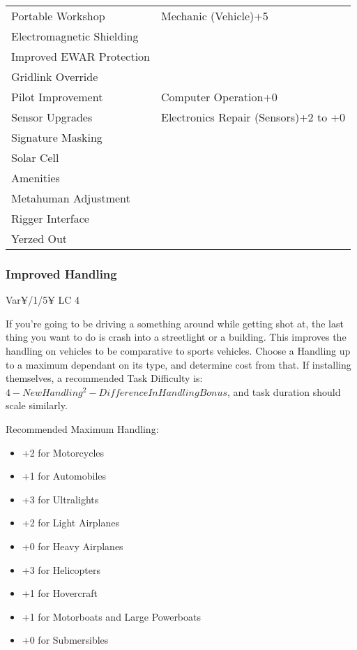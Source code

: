 \begin{multicols*}{2}
\begin{center}
\begin{adjustwidth}{-9mm}{}
{\begin{tabular}{|p{5cm}|p{6.25cm}|}
					Portable Workshop & Mechanic (Vehicle)+5 \\
					Electromagnetic Shielding & \\
					Improved EWAR Protection & \\
					Gridlink Override & \\
					Pilot Improvement & Computer Operation+0 \\
					Sensor Upgrades & Electronics Repair (Sensors)+2 to +0 \\
					Signature Masking & \\
					Solar Cell & \\
					Amenities & \\
					Metahuman Adjustment & \\
					Rigger Interface & \\
					Yerzed Out & \\
					\hline
				\end{tabular}
			}
		\end{adjustwidth}
	\end{center}
	
	

	\subsubsection{Improved Handling}
	Var¥/1/5¥ LC 4
	
	If you're going to be driving a something around while getting shot at, the last thing you want to do is crash into a streetlight or a building. This improves the handling on vehicles to be comparative to sports vehicles. Choose a Handling up to a maximum dependant on its type, and determine cost from that. If installing themselves, a recommended Task Difficulty is: $4 - New Handling^2 - Difference In Handling Bonus$, and task duration should scale similarly.
	
	Recommended Maximum Handling:
	\begin{itemize}
		\itemsep 0pt
		\item +2 for Motorcycles
		\item +1 for Automobiles
		\item +3 for Ultralights
		\item +2 for Light Airplanes
		\item +0 for Heavy Airplanes
		\item +3 for Helicopters
		\item +1 for Hovercraft
		\item +1 for Motorboats and Large Powerboats
		\item +0 for Submersibles
	\end{itemize}
	

\end{multicols*}

